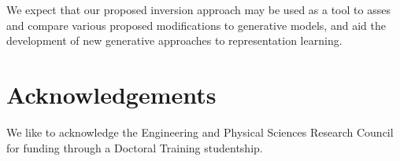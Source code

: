 \documentclass[journal]{IEEEtran}
\begin{document}
We expect that our proposed inversion approach may be used as a tool to asses and compare various proposed modifications to generative models, and aid the development of new generative approaches to representation learning.








 



\section*{Acknowledgements}
We like to acknowledge the Engineering and Physical Sciences Research Council for funding through a Doctoral Training studentship.



\end{document}
